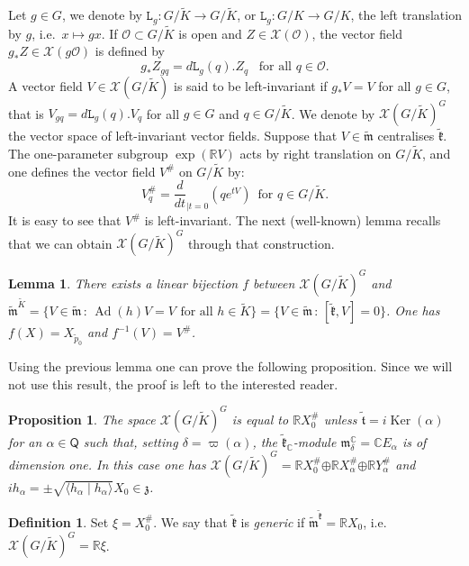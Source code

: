 \documentclass[a4paper,reqno]{amsart}
\newtheorem{lem}[thm]{Lemma}
\newtheorem{prop}[thm]{Proposition}
\theoremstyle{definition}
\newtheorem{defn}[thm]{Definition}
\theoremstyle{remark}
\theoremstyle{plain}
\numberwithin{equation}{section}
\newcommand{\C}{{\mathbb{C}}}
\newcommand{\R}{{\mathbb{R}}}
\newcommand{\calX}{{\mathcal{X}}}
\newcommand{\calO}{{\mathcal{O}}}  \newcommand{\cO}{{\mathcal{O}}}
\newcommand{\fm}{{\mathfrak{m}}}
\newcommand{\fz}{{\mathfrak{z}}}
\newcommand{\mto}{\mapsto}
\def\Ker{\operatorname {Ker}}
\DeclareMathOperator{\Ad}{{Ad}}
\def\boplus{\mathbin{\boldsymbol{\oplus}}}
\newcommand{\ascal}[2]{{\langle {#1}  \mid {#2} \rangle}}
\newcommand{\vpi}{\varpi}
\newcommand{\rootsQ}{\mathsf{Q}}
\newcommand{\Kt}{{\widetilde{K}}}
\newcommand{\wK}{{\widetilde{K}}}
\newcommand{\wk}{{\widetilde{\mathfrak{k}}}}
\newcommand{\wt}{{\widetilde{\mathfrak{t}}}}
\newcommand{\wm}{{\widetilde{\mathfrak{m}}}}
\newcommand{\wpzero}{{\tilde{p}_0}}
\newcommand{\ltr}{\mathtt{L}}
\begin{document}
Let $g \in G$, we denote by $\ltr_g : G/\Kt \to G/\Kt$, or
$\ltr_g : G/K \to G/K$, the left translation by $g$,
i.e.~$x \mto gx$. If $\calO \subset G/\Kt$ is open and
$Z \in \calX(\calO)$, the vector field
$g_*Z \in \calX(g\calO)$ is defined by
\[
g_*Z_{gq} = d\ltr_g(q). Z_q \ \; \text{ for all $q \in \calO$.}
\]
A vector field  $V \in \calX(G/\Kt)$ is said to be left-invariant 
if  $g_* V= V$ for all $g \in G$, that is $V_{gq} =
d\ltr_g(q).V_q$ for all $g \in G$ and $q \in G/\Kt$.
We denote by $\calX(G/\Kt)^G$ the vector space of left-invariant
vector fields.
Suppose that $V \in \wm$ centralises $\wk$.  The one-parameter
subgroup $\exp(\R V)$ acts by right translation on $G/\Kt$,
and one defines the vector field $V ^\#$ on $G/\Kt$ by:
\begin{equation*}
  \label{34}
  V ^\#_q= \frac{d}{dt}_{\big| t= 0} \left(qe^{tV} \right) \ \;
  \text{for $q \in G/\Kt$.}
\end{equation*}
It is easy to see that $V^\#$ is left-invariant.  The next 
(well-known) lemma recalls that we can obtain $\calX(G/\Kt)^G$
through that construction.



\begin{lem}
  \label{lem2.1}
  There exists a linear bijection $f$ between  $\calX(G/\Kt)^G$
  and
  $\wm^\wK= \{V  \in \wm \, : \, \Ad(h)V= V \ \, \text{for all $h
    \in \wK$}\} =  \{V  \in \wm \, : \, [\wk,V]= 0\}$.
 One has  $f(X) =X_{\wpzero}$ and $f^{-1}(V) = V^\#$.
\end{lem}

Using the previous lemma one can prove the following
proposition. Since we will not use this result, the proof is left
to the interested reader.  

\begin{prop}
  \label{prop6.9}
  The space $\calX(G/\Kt)^G$ is equal to $\R X_0^\#$ unless
  $\wt = i \Ker(\alpha)$ for an $\alpha \in \rootsQ$ such that,
  setting $\delta = \vpi(\alpha)$, the $\wk_\C$-module
  $\fm_\delta^\C = \C E_\alpha$ is of dimension one.  In this
  case one has
  $\calX(G/\Kt)^G = \R X_0^\# \boplus \R X_\alpha^\# \boplus \R
  Y_\alpha^\#$ and
  $ih_\alpha = \pm \sqrt{\ascal{h_\alpha}{h_\alpha}} X_0 \in
  \fz$. 
\end{prop}

\begin{defn} \label{rem6.9}
Set $\xi = X_0^\#$.
We say that $\wk$ is \emph{generic} if $\wm^\wk= \R X_0$,
i.e.~$\calX(G/\Kt)^G= \R \xi$. 
\end{defn}
\end{document}
